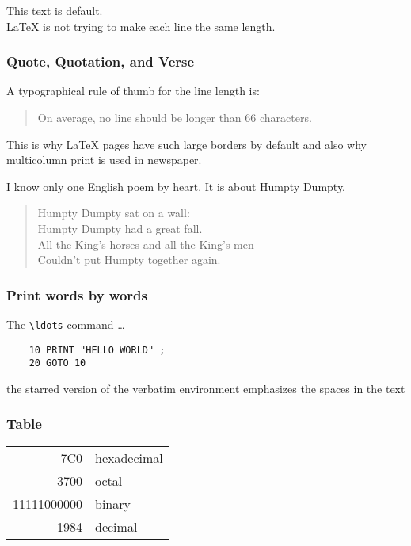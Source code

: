 \documentclass[a4paper,11pt]{article}
\begin{document}
This text is default.\\
\LaTeX{} is not trying to make each line
the same length.

\subsubsection{Quote, Quotation, and Verse}
A typographical rule of thumb
for the line length is:
\begin{quote}
    On average, no line should
    be longer than 66 characters.
\end{quote}
This is why \LaTeX{} pages have such large borders
by default and also why multicolumn print is used in
newspaper.


I know only one English poem by heart.
It is about Humpty Dumpty.
\begin{flushleft}
    \begin{verse}
        Humpty Dumpty sat on a wall:\\
        Humpty Dumpty had a great fall.\\
        All the King's horses and all the
        King's men\\
        Couldn't put Humpty together again.
    \end{verse}
\end{flushleft}
\subsubsection{Print words by words}
The \verb|\ldots| command \ldots
\begin{verbatim}
    10 PRINT "HELLO WORLD" ;
    20 GOTO 10
\end{verbatim}

\begin{verbatim*}
    the starred version of 
    the     verbatim
    environment emphasizes
    the spaces in the text
\end{verbatim*}
\subsubsection{Table}
\begin{tabular}{|r|l|}
    \hline
    7C0 & hexadecimal \\
    3700 & octal \\ \cline{2-2}
    11111000000 & binary \\
    \hline \hline1984 & decimal \\
    \hline
\end{tabular}
\end{document}

